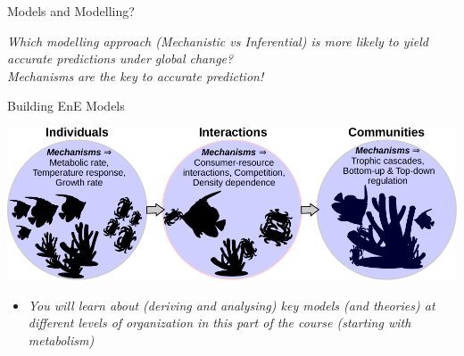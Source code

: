 \documentclass[xcolor=x11names,compress]{beamer}
\renewcommand{\(}{\begin{columns}}
\renewcommand{\)}{\end{columns}}
\newcommand{\<}[1]{\begin{column}{#1}}
\renewcommand{\>}{\end{column}}
\begin{document}
\begin{frame}{Models and Modelling?}

	\begin{center}

		\it Which modelling approach (Mechanistic vs Inferential) is more likely to yield accurate predictions under global change?\\
		\vspace{20pt}
		\pause 
		Mechanisms are the key to accurate {\it prediction}!
		
	  \end{center}
 
 \end{frame}

\begin{frame}{Building EnE Models}
	 
\begin{center}
	\includegraphics[width=\textwidth]{Mechanisms.pdf}
\end{center} 

\begin{itemize}\itemsep2pt

	\item \it You will learn about (deriving and analysing) key models (and theories) at different levels of organization in this part of the course (starting with metabolism)

\end{itemize}   

\end{frame}
\end{document}
